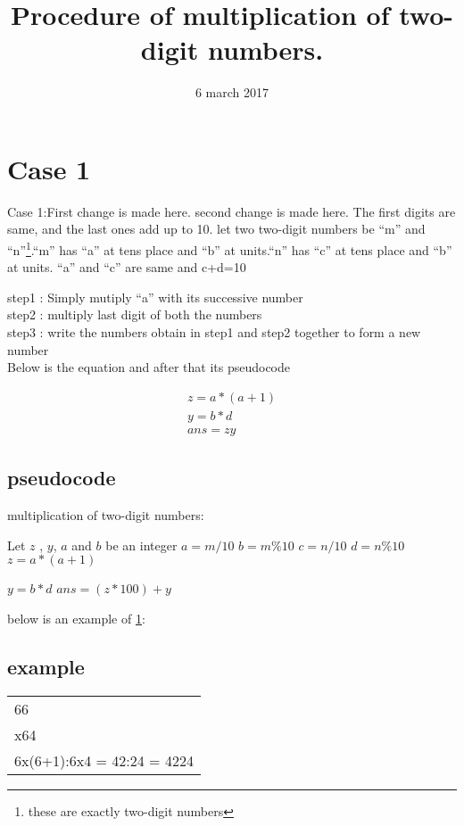 \documentclass{article}
\title{\huge Procedure of multiplication of two-digit numbers.}
\date{6 march 2017}
\begin{document}
\begin{titlepage}
\maketitle
\end{titlepage}
\newpage
\section{Case 1} \label{case 1}
\noindent Case 1:First change is made here.
second change is made here.  The first digits are same, and the last ones add up to 10.
let two two-digit numbers be ``m'' and ``n''\footnote{these are exactly two-digit numbers}.``m'' has ``a'' at tens place and ``b'' at units.``n'' has ``c'' at tens place and ``b'' at units. ``a'' and ``c'' are same and c+d=10\cite{athar}

\noindent step1 : Simply mutiply ``a'' with its successive number \\
step2 : multiply last digit of both the numbers \\
step3 : write the numbers obtain in step1 and step2 together to form a new number\\

\noindent Below is the equation and after that its pseudocode


\begin{align*}
	z=a*(a+1)  \\
	y=b*d \\
	ans=zy
	\end{align*}
\subsection{pseudocode}
  \begin{algorithm}
   \caption{multiplication of two-digit numbers: }
    \begin{algorithmic}[1]
	\State 

	\State Let $z$ , $y$, $a$ and $b$ be an integer
\State $a=m/10$
\State $b=m\%10$
\State $c=n/10$
\State $d=n\%10$
	\State $z=a*(a+1)$
	
	\State $y=b*d$
	\State $ans=(z*100)+y$ 
	
	\EndIf
	\EndFunction
\end{algorithmic}
\end{algorithm}
\noindent below is an example of \ref{case 1}:
\newline
\subsection{example}
\begin{tabular}{l} 
66\\

x64\\

6x(6+1):6x4 = 42:24 = 4224\\
\end{tabular}
\end{document}
